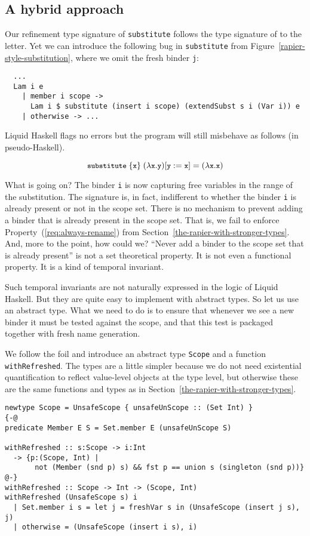 \documentclass[sigconf]{acmart}
\newcommand{\tc}[1]{{\small\texttt{#1}}}
\newcommand{\codeblocksize}{\fontsize{6.5}{9}\selectfont}
\begin{document}
\subsection{A hybrid approach}
\label{ensuring-the-scope-set-is-checked}

Our refinement type signature of \tc{substitute} follows the type signature of
\citeauthor{maclaurin23} to the letter.
Yet we can introduce the following bug in \tc{substitute} from
Figure~\ref{rapier-style-substitution}, where we omit the fresh binder \tc{j}:
\begin{verbatim}
  ...
  Lam i e
    | member i scope ->
      Lam i $ substitute (insert i scope) (extendSubst s i (Var i)) e
    | otherwise -> ...
\end{verbatim}
Liquid Haskell flags no errors but the program will still misbehave as
follows (in pseudo-Haskell).

$$\codeblocksize{\tc{substitute}~\{\tc{x}\}~(\lambda{}\tc{x}. \tc{y}) [\tc{y}:=\tc{x}] = (\lambda{}\tc{x}. \tc{x})}$$

What is going on? The binder \tc{i} is now capturing free variables in the
range of the substitution. The signature is, in fact, indifferent to whether
the binder \tc{i} is already present or not in the scope set. There is no
mechanism to prevent adding a binder that is already present in the scope set.
That is, we fail to enforce Property~(\ref{req:always-rename}) from Section~\ref{the-rapier-with-stronger-types}.
And, more to the point, how could we? “Never add a binder to the scope set that is already
present” is not a set theoretical property. It is not even a functional property.
It is a kind of temporal invariant.

Such temporal invariants are not naturally expressed in the logic of Liquid Haskell.
But they are quite easy to implement with abstract types. So let us use an abstract
type. What we need to do is to ensure that whenever we see a new binder it must
be tested against the scope, and that this test is packaged together with fresh
name generation.

We follow the foil and
introduce an abstract type \tc{Scope} and a function \tc{withRefreshed}. The types are a little
simpler because we do not need existential quantification to reflect value-level
objects at the type level, but otherwise these are the same functions and types
as in Section~\ref{the-rapier-with-stronger-types}.
\begin{verbatim}
newtype Scope = UnsafeScope { unsafeUnScope :: (Set Int) }
{-@
predicate Member E S = Set.member E (unsafeUnScope S)

withRefreshed :: s:Scope -> i:Int
  -> {p:(Scope, Int) |
       not (Member (snd p) s) && fst p == union s (singleton (snd p))}
@-}
withRefreshed :: Scope -> Int -> (Scope, Int)
withRefreshed (UnsafeScope s) i
  | Set.member i s = let j = freshVar s in (UnsafeScope (insert j s), j)
  | otherwise = (UnsafeScope (insert i s), i)
\end{verbatim}
\end{document}

